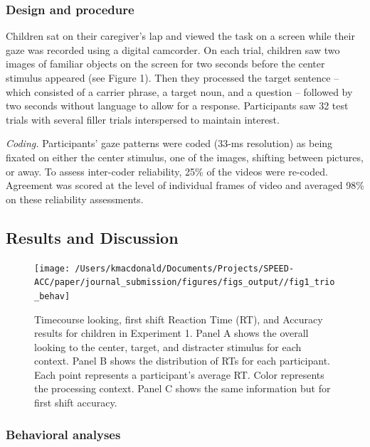 \documentclass[english,floatsintext,man]{apa6}
\begin{document}
\hypertarget{design-and-procedure}{%
\subsubsection{Design and procedure}\label{design-and-procedure}}

Children sat on their caregiver's lap and viewed the task on a screen
while their gaze was recorded using a digital camcorder. On each trial,
children saw two images of familiar objects on the screen for two
seconds before the center stimulus appeared (see Figure 1). Then they
processed the target sentence -- which consisted of a carrier phrase, a
target noun, and a question -- followed by two seconds without language
to allow for a response. Participants saw 32 test trials with several
filler trials interspersed to maintain interest.

\emph{Coding.} Participants' gaze patterns were coded (33-ms resolution)
as being fixated on either the center stimulus, one of the images,
shifting between pictures, or away. To assess inter-coder reliability,
25\% of the videos were re-coded. Agreement was scored at the level of
individual frames of video and averaged 98\% on these reliability
assessments.

\hypertarget{results-and-discussion}{%
\subsection{Results and Discussion}\label{results-and-discussion}}

\begin{figure}[!t]

{\centering \texttt{[image: /Users/kmacdonald/Documents/Projects/SPEED-ACC/paper/journal\_submission/figures/figs\_output//fig1\_trio\_behav]} 

}

\caption{Timecourse looking, first shift Reaction Time (RT), and Accuracy results for children in Experiment 1. Panel A shows the overall looking to the center, target, and distracter stimulus for each context. Panel B shows the distribution of RTs for each participant. Each point represents a participant's average RT. Color represents the processing context. Panel C shows the same information but for first shift accuracy.}\label{fig:speed-acc-trio-plot}
\end{figure}

\hypertarget{behavioral-analyses}{%
\subsubsection{Behavioral analyses}\label{behavioral-analyses}}
\end{document}
